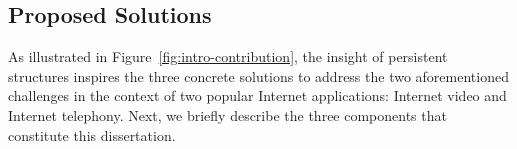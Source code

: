 \subsection{Proposed Solutions}
As illustrated in Figure~\ref{fig:intro-contribution}, 
the insight of persistent structures inspires the three concrete solutions
to address the two aforementioned challenges in the context
of two popular Internet applications: Internet video and Internet telephony. 
Next, we briefly describe the three components that constitute 
this dissertation.




